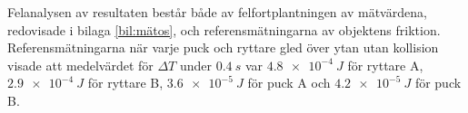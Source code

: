 Felanalysen av resultaten består både av felfortplantningen av mätvärdena, redovisade i bilaga \ref{bil:mätos}, och referensmätningarna av objektens friktion. Referensmätningarna när varje puck och ryttare gled över ytan utan kollision visade att medelvärdet för $\Delta T$ under $\qty{0.4}{s}$ var $\SI{4.8e-4}{J}$ för ryttare A, $\SI{2.9e-4}{J}$ för ryttare B, \( \SI{3.6e-5}{J}\) för puck A och \(\SI{4.2e-5}{J}\) för puck B. 